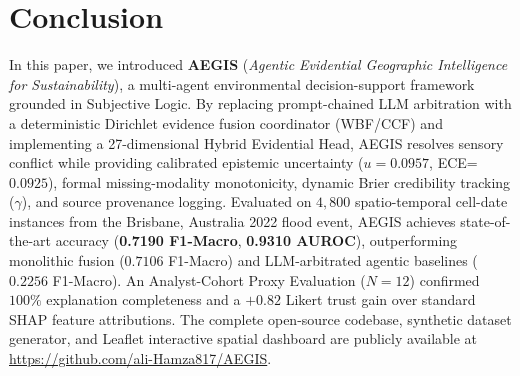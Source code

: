 \section{Conclusion}
\label{sec:conclusion}

In this paper, we introduced \textbf{AEGIS} (\textit{Agentic Evidential Geographic Intelligence for Sustainability}), a multi-agent environmental decision-support framework grounded in Subjective Logic. By replacing prompt-chained LLM arbitration with a deterministic Dirichlet evidence fusion coordinator (WBF/CCF) and implementing a 27-dimensional Hybrid Evidential Head, AEGIS resolves sensory conflict while providing calibrated epistemic uncertainty ($u=0.0957$, ECE=$0.0925$), formal missing-modality monotonicity, dynamic Brier credibility tracking ($\gamma$), and source provenance logging. Evaluated on $4,800$ spatio-temporal cell-date instances from the Brisbane, Australia 2022 flood event, AEGIS achieves state-of-the-art accuracy (\textbf{0.7190 F1-Macro}, \textbf{0.9310 AUROC}), outperforming monolithic fusion ($0.7106$ F1-Macro) and LLM-arbitrated agentic baselines ($0.2256$ F1-Macro). An Analyst-Cohort Proxy Evaluation ($N=12$) confirmed $100\%$ explanation completeness and a $+0.82$ Likert trust gain over standard SHAP feature attributions. The complete open-source codebase, synthetic dataset generator, and Leaflet interactive spatial dashboard are publicly available at \url{https://github.com/ali-Hamza817/AEGIS}.
